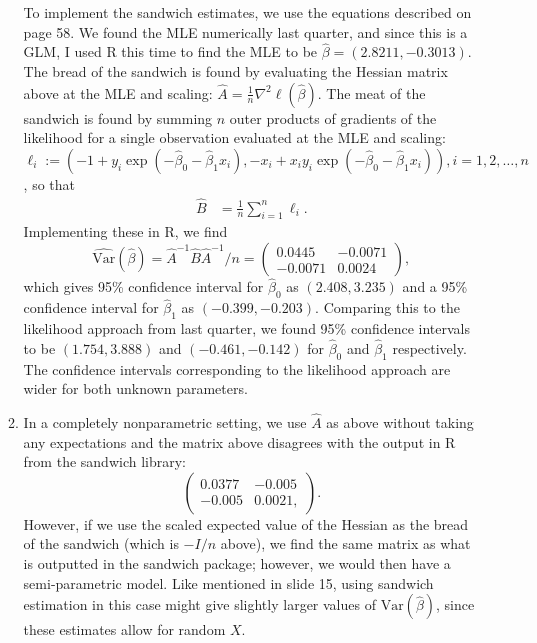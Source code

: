 \documentclass[11pt]{article}
\newcommand{\Var}{\mathrm{Var}}
\begin{document}
\begin{enumerate}
\begin{enumerate}
\[		\]
		To implement the sandwich estimates, we use the equations described on page 58. We found the MLE numerically last quarter, and since this is a GLM, I used R this time to find the MLE to be $\widehat{\beta} = ( 2.8211,  -0.3013)$. The bread of the sandwich is found by evaluating the Hessian matrix above at the MLE and scaling: $\widehat{A} = \frac{1}{n}\nabla^2 \ell(\widehat{\beta})$. The meat of the sandwich is found by summing $n$ outer products of gradients of the likelihood for a single observation evaluated at the MLE and scaling: $\ell_i:= (-1+y_i\exp(-\widehat{\beta}_0 - \widehat{\beta}_1x_i), -x_i + x_iy_i\exp(-\widehat{\beta}_0 - \widehat{\beta}_1x_i)), i=1,2,\dotsc,n$, so that
		\begin{align*}
			\widehat{B} &= \frac{1}{n}\sum_{i=1}^n \ell_i.
		\end{align*}
		Implementing these in R, we find
		\[
			\widehat{\Var}(\widehat{\beta}) = \widehat{A}^{-1}\widehat{B}\widehat{A}^{-1}/n = \begin{pmatrix}
			0.0445 & -0.0071 \\ -0.0071 & 0.0024
			\end{pmatrix},
		\]
		which gives 95\% confidence interval for $\widehat{\beta}_0$ as $(2.408,3.235)$ and a 95\% confidence interval for $\widehat{\beta}_1$ as $(-0.399,-0.203)$. Comparing this to the likelihood approach from last quarter, we found 95\% confidence intervals to be $(1.754,3.888)$ and $(-0.461,-0.142)$ for $\widehat{\beta}_0$ and $\widehat{\beta}_1$ respectively. The confidence intervals corresponding to the likelihood approach are wider for both unknown parameters.
			\item In a completely nonparametric setting, we use $\widehat{A}$ as above without taking any expectations and the matrix above disagrees with the output in R from the sandwich library:
			\[
				\begin{pmatrix}
				0.0377 & -0.005 \\ -0.005 & 0.0021,
				\end{pmatrix}.
			\]
However, if we use the scaled expected value of the Hessian as the bread of the sandwich (which is $-I/n$ above), we find the same matrix as what is outputted in the sandwich package; however, we would then have a semi-parametric model. Like mentioned in slide 15, using sandwich estimation in this case might give slightly larger values of $\Var(\widehat{\beta})$, since these estimates allow for random $X$.
		\end{enumerate}
	

\end{enumerate}
\end{document}
